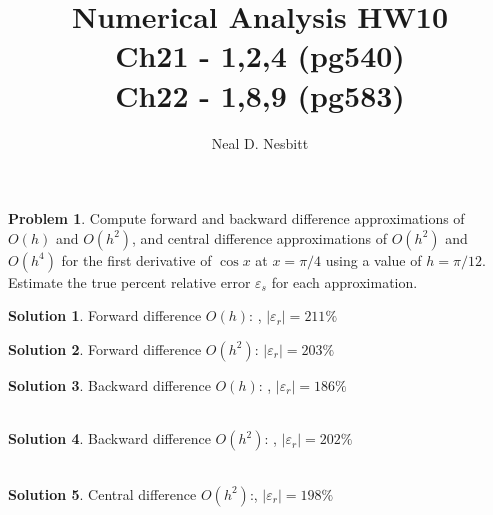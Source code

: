 \documentclass{article}
\title{Numerical Analysis HW10\\
Ch21 - 1,2,4 (pg540)\\
Ch22 - 1,8,9 (pg583)\\}
\author{Neal D. Nesbitt}
\begin{document}
\maketitle

\theoremstyle{definition}
\newtheorem{problem}{Problem}[section]
\newtheorem{solution}{Solution}[problem]
\renewcommand*{\thesolution}{\theproblem.\alph{solution}}


\setcounter{section}{20}
\section{}
\begin{problem}
Compute forward and backward difference approximations of $O(h)$ and $O(h^{2})$, and central difference approximations of $O(h^{2})$ and $O(h^{4})$ for the first derivative of $\cos x$ at $x = \pi/4$ using a value of $h=\pi/12$. Estimate the true percent relative error $\varepsilon_{s}$ for each approximation.
\end{problem}

\begin{solution}
Forward difference $O(h)$: , $|\varepsilon_{r}| = \boxed{211\%}$
\end{solution}

\begin{solution}
Forward difference $O(h^{2})$:   $|\varepsilon_{r}| = \boxed{203\%}$\\
\end{solution}

\begin{solution}
Backward difference $O(h)$: , $|\varepsilon_{r}| = \boxed{186\%}$\\\\
\end{solution}

\begin{solution}
Backward difference $O(h^{2})$: , $|\varepsilon_{r}| = \boxed{202\%}$\\\\
\end{solution}

\begin{solution}
Central difference $O(h^{2})$:, $|\varepsilon_{r}| = \boxed{198\%}$\\\\
\end{solution}
\end{document}
